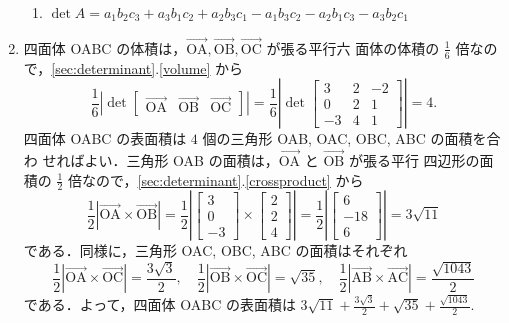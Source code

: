 \documentclass[11pt, uplatex, dvipdfmx]{jsarticle}
\renewcommand*{\vec}[1]{\overrightarrow{\textrm{#1}}}
\begin{document}
\begin{enumerate}
\begin{enumerate}[(1)]
  \item $\det A = a_1 b_2 c_3 + a_3b_1c_2 + a_2 b_3 c_1 - a_1b_3c_2 - a_2 b_1 c_3 - a_3 b_2 c_1$
    
  \end{enumerate}

\item 四面体 OABC の体積は，$\vec{OA}, \vec{OB}, \vec{OC}$ が張る平行六
  面体の体積の $\frac{1}{6}$ 倍なので，\ref{sec:determinant}.\ref{volume} から
  \[
    \frac{1}{6} \left| \det\left[
        \begin{array}{ccc}
          \vec{OA} & \vec{OB} & \vec{OC}
        \end{array}
      \right] \right| = \frac{1}{6} \left| \det\left[
        \begin{array}{rrr}
          3 & 2 & -2\\
          0 & 2 & 1\\
          -3 & 4 & 1
        \end{array}
      \right]\right| =4. 
  \]
  四面体 OABC の表面積は $4$ 個の三角形 OAB, OAC, OBC, ABC の面積を合わ
  せればよい．三角形 OAB の面積は，$\vec{OA}$ と $\vec{OB}$ が張る平行
  四辺形の面積の $\frac{1}{2}$ 倍なので，\ref{sec:determinant}.\ref{crossproduct} から
  \[
    \frac{1}{2}\left| \vec{OA} \times \vec{OB}\right| = \frac{1}{2}\left| \left[
        \begin{array}{r}
          3\\
          0\\
          -3
        \end{array}
      \right] \times \left[
        \begin{array}{r}
          2\\
          2\\
          4
        \end{array}
      \right]\right| = \frac{1}{2}\left|\left[
        \begin{array}{r}
          6\\
          -18\\
          6
        \end{array}
      \right]\right| = 3\sqrt{11}
  \]
  である．同様に，三角形 OAC, OBC, ABC の面積はそれぞれ
  \[
    \frac{1}{2}\left| \vec{OA} \times \vec{OC}\right| = \frac{3\sqrt{3}}{2}, \quad
    \frac{1}{2}\left| \vec{OB} \times \vec{OC}\right| = \sqrt{35}, \quad
    \frac{1}{2}\left| \vec{AB} \times \vec{AC}\right| = \frac{\sqrt{1043}}{2}
  \]
  である．よって，四面体 OABC の表面積は
  $3\sqrt{11} + \frac{3\sqrt{3}}{2} + \sqrt{35} +
  \frac{\sqrt{1043}}{2}$.


\end{enumerate}
\end{document}
